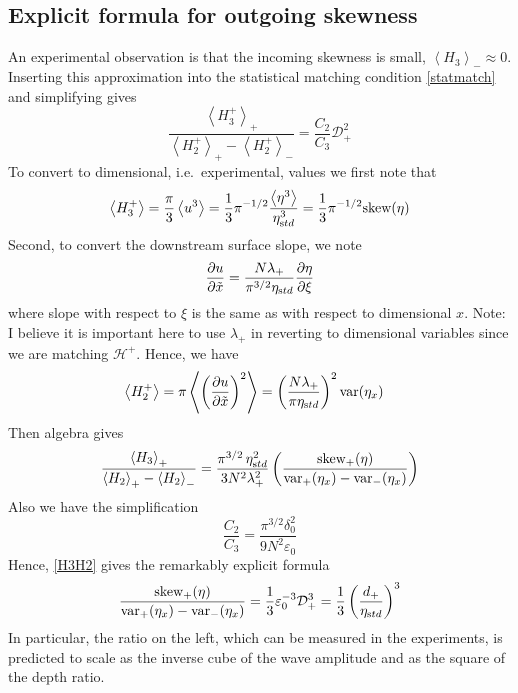 \documentclass[11pt]{article}
\newcommand{\pd}[2]    { \frac{\partial #1} {\partial #2} }
\newcommand{\mean}[1]{\left< #1 \right>}
\newcommand{\eps}{\varepsilon}
\newcommand{\etastd}{\eta_{\text std}}
\newcommand{\depth}{d}
\newcommand{\ddn}{\depth_{+}}
\newcommand{\lam}{\lambda}
\newcommand{\lamdn}{\lam_{+}}
\newcommand{\lamfac}{N}
\newcommand{\drat}{\mathcal{D}}
\newcommand{\dratdn}{\drat_+}
\newcommand{\skw}{\text{skew}}
\newcommand{\skwdn}{\skw_+}
\newcommand{\var}{\text{var}}
\newcommand{\varup}{\var_-}
\newcommand{\vardn}{\var_+}
\newcommand{\epsup}{\eps_0}
\newcommand{\delup}{\delta_0}
\newcommand{\Ham}{\mathcal{H}}
\newcommand{\Hdn}{\Ham^{+}}
\newcommand{\meanup}[1]{\mean{#1}_{-}}
\newcommand{\meandn}[1]{\mean{#1}_{+}}
\begin{document}
\subsection{Explicit formula for outgoing skewness}
An experimental observation is that the incoming skewness is small, $\meanup{H_3} \approx 0$. Inserting this approximation into the statistical matching condition \eqref{statmatch} and simplifying gives
\begin{equation}
\label{H3H2}
\frac{\meandn{H_3^+}} {\meandn{H_2^+} - \meanup{H_2^+}} = \frac{C_2}{C_3} \dratdn^2
\end{equation}
To convert to dimensional, i.e.~experimental, values we first note that
\begin{align}
\mean{H_3^+} = \frac{\pi}{3} \mean{u^3} = 
\frac{1}{3} \pi^{-1/2} \frac{\mean{\eta^3}}{\etastd^3} = \frac{1}{3} \pi^{-1/2} \skw(\eta)
\end{align}
Second, to convert the downstream surface slope, we note
\begin{align}
\pd{u}{\tilde{x}} = \frac{\lamfac \lamdn}{\pi^{3/2} \etastd} \pd{\eta}{\xi}
\end{align}
where slope with respect to $\xi$ is the same as with respect to dimensional $x$.
Note: I believe it is important here to use $\lamdn$ in reverting to dimensional variables since we are matching $\Hdn$.
Hence, we have
\begin{align}
&\mean{H_2^+} = \pi \mean{ \left( \pd{u}{\tilde{x}} \right)^2} = 
\left( \frac{\lamfac \lamdn}{\pi \etastd} \right)^2 \var(\eta_x)
\end{align}
%
Then algebra gives
\begin{equation}
\frac{\meandn{H_3}} {\meandn{H_2} - \meanup{H_2}} = 
\frac{\pi^{3/2} \, \etastd^2} {3 \lamfac^2 \lamdn^2} 
\left( \frac{\skwdn(\eta)} { \vardn(\eta_x) - \varup(\eta_x)} \right)
\end{equation}
Also we have the simplification
\begin{equation}
\frac{C_2}{C_3} = \frac{\pi^{3/2} \delup^2}{9 \lamfac^2 \epsup}
\end{equation}
Hence, \eqref{H3H2} gives the remarkably explicit formula
\begin{equation}
\frac{\skwdn(\eta)} {\vardn(\eta_x) - \varup(\eta_x)} = \frac{1}{3} \epsup^{-3} \dratdn^3 =
\frac{1}{3} \left( \frac{\ddn}{\etastd} \right)^3
\end{equation}
In particular, the ratio on the left, which can be measured in the experiments, is predicted to scale as the inverse cube of the wave amplitude and as the square of the depth ratio.
\end{document}

